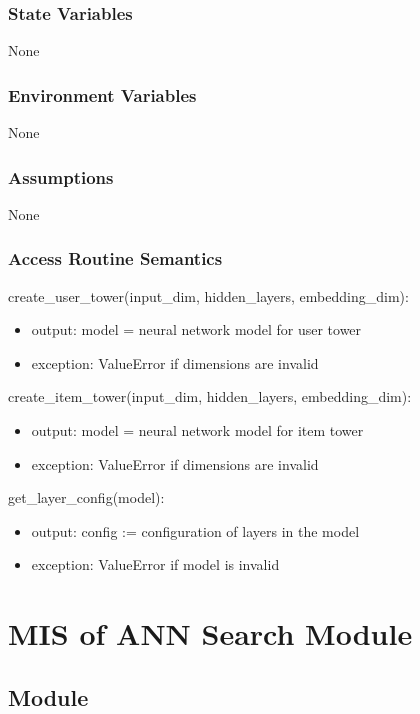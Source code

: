 \documentclass[12pt, titlepage]{article}
\begin{document}
\subsubsection{State Variables}
None

\subsubsection{Environment Variables}

None

\subsubsection{Assumptions}

None

\subsubsection{Access Routine Semantics}

\noindent create\_user\_tower(input\_dim, hidden\_layers, embedding\_dim):
\begin{itemize}
\item output: model = neural network model for user tower
\item exception: ValueError if dimensions are invalid
\end{itemize}

\noindent create\_item\_tower(input\_dim, hidden\_layers, embedding\_dim):
\begin{itemize}
\item output: model = neural network model for item tower
\item exception: ValueError if dimensions are invalid
\end{itemize}

\noindent get\_layer\_config(model):
\begin{itemize}
\item output: config := configuration of layers in the model
\item exception: ValueError if model is invalid
\end{itemize}

\section{MIS of ANN Search Module} \label{ModuleANN}

\subsection{Module}
\end{document}
